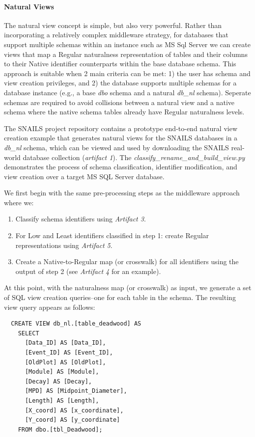 \paragraph{\textbf{Natural Views}}

The natural view concept is simple, but also very powerful.
Rather than incorporating a relatively complex middleware strategy, for databases that support multiple schemas within an instance such as MS Sql Server we can create views that map a Regular naturalness representation of tables and their columns to their Native identifier counterparts within the base database schema.
This approach is suitable when 2 main criteria can be met: 1) the user has schema and view creation privileges, and 2) the database supports multiple schemas for a database instance (e.g., a base \emph{dbo} schema and a natural \emph{db\_nl} schema).
Seperate schemas are required to avoid collisions between a natural view and a native schema where the native schema tables already have Regular naturalness levels.

The SNAILS project repository contains a prototype end-to-end natural view creation example that generates natural views for the SNAILS databases in a \emph{db\_nl} schema, which can be viewed and used by downloading the SNAILS real-world database collection (\emph{artifact 1}).
The \emph{classify\_rename\_and\_build\_view.py} demonstrates the process of schema classification, identifier modification, and view creation over a target MS SQL Server database.

We first begin with the same pre-processing steps as the middleware approach where we:
\begin{enumerate}
  \item Classify schema identifiers using \emph{Artifact 3}.
  \item For Low and Least identifiers classified in step 1: create Regular representations using \emph{Artifact 5}.
  \item Create a Native-to-Regular map (or crosswalk) for all identifiers using the output of step 2 (see \emph{Artifact 4} for an example).
\end{enumerate}

At this point, with the naturalness map (or crosswalk) as input, we generate a set of SQL view creation queries--one for each table in the schema.
The resulting view query appears as follows:

\begin{verbatim}
  CREATE VIEW db_nl.[table_deadwood] AS
    SELECT 
      [Data_ID] AS [Data_ID], 
      [Event_ID] AS [Event_ID], 
      [OldPlot] AS [OldPlot], 
      [Module] AS [Module], 
      [Decay] AS [Decay], 
      [MPD] AS [Midpoint_Diameter], 
      [Length] AS [Length], 
      [X_coord] AS [x_coordinate], 
      [Y_coord] AS [y_coordinate]
    FROM dbo.[tbl_Deadwood];
\end{verbatim}

